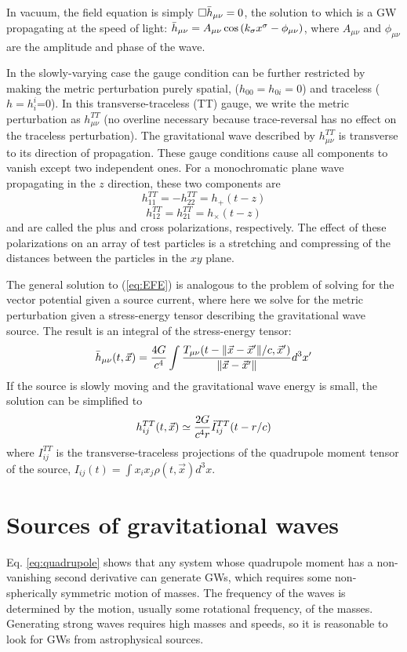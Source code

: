 In vacuum, the field equation is simply $\Box\Bar{h}_{\mu\nu}=0$, the solution to which is a \ac{GW} propagating at the speed of light: $\Bar{h}_{\mu\nu} = A_{\mu\nu}\cos\left(k_\sigma x^\sigma - \phi_{\mu\nu}\right)$, where $A_{\mu\nu}$ and $\phi_{\mu\nu}$ are the amplitude and phase of the wave.

In the slowly-varying case the gauge condition can be further restricted by making the metric perturbation purely spatial, ($h_{00}=h_{0i}=0$) and traceless ($h=h_i^i$=0).
In this transverse-traceless (TT) gauge, we write the metric perturbation as $h_{\mu\nu}^{TT}$ (no overline necessary because trace-reversal has no effect on the traceless perturbation).
The gravitational wave described by $h_{\mu\nu}^{TT}$ is transverse to its direction of propagation.
These gauge conditions cause all components to vanish except two independent ones.
For a monochromatic plane wave propagating in the $z$ direction, these two components are
$$h_{11}^{TT} = -h_{22}^{TT} = h_+(t-z)$$
$$h_{12}^{TT} = h_{21}^{TT} = h_{\times}(t-z)$$
and are called the plus and cross polarizations, respectively.
The effect of these polarizations on an array of test particles is a stretching and compressing of the distances between the particles in the $xy$ plane.

The general solution to (\ref{eq:EFE}) is analogous to the problem of solving for the vector potential given a source current, where here we solve for the metric perturbation given a stress-energy tensor describing the gravitational wave source.
The result is an integral of the stress-energy tensor:
$$\Bar{h}_{\mu\nu}(t, \vec{x}) = \frac{4G}{c^4} \int\frac{T_{\mu\nu}(t - \norm{\vec{x} - \vec{x}'}/c, \vec{x}')}{\norm{\vec{x} - \vec{x}'}} d^3x'$$
If the source is slowly moving and the gravitational wave energy is small, the solution can be simplified to
\begin{equation}\label{eq:quadrupole}
	h_{ij}^{TT}(t, \vec{x}) \simeq \frac{2G}{c^4r} \Ddot{I}_{ij}^{TT}(t - r/c)
\end{equation}
where $I_{ij}^{TT}$ is the transverse-traceless projections of the quadrupole moment tensor of the source, $I_{ij}(t) = \int x_i x_j \rho(t, \vec{x}) d^3x$.

\section{Sources of gravitational waves}

Eq. \ref{eq:quadrupole} shows that any system whose quadrupole moment has a non-vanishing second derivative can generate \acp{GW}, which requires some non-spherically symmetric motion of masses.
The frequency of the waves is determined by the motion, usually some rotational frequency, of the masses.
Generating strong waves requires high masses and speeds, so it is reasonable to look for \acp{GW} from astrophysical sources.

